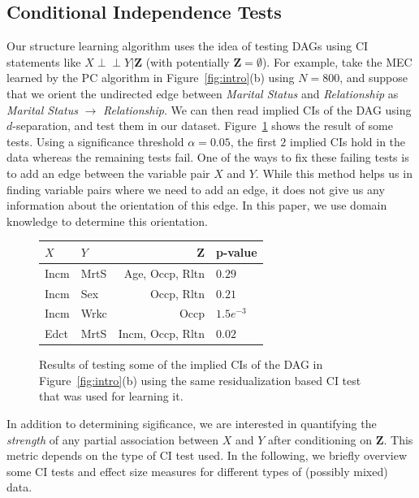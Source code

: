 \documentclass[accepted]{uai2025} %
\def\ci{\perp\!\!\!\!\perp}
\begin{document}
\subsection{Conditional Independence Tests}
\label{sec:ci_tests}
Our structure learning algorithm uses the idea of testing DAGs using CI statements
like $ X \ci Y \rvert \bm{Z} $ (with
potentially $ \bm{Z} = \emptyset $).
For example, take the MEC learned by the PC algorithm in
Figure~\ref{fig:intro}(b) using $ N=800 $, and suppose that we orient 
the undirected edge between \emph{Marital Status} and
\emph{Relationship}  as \emph{Marital Status} $ \rightarrow $
\emph{Relationship}. We can then read implied CIs of the DAG using $d$-separation,
and test them in our dataset. Figure~\ref{fig:ci_table} shows the result of some tests. 
Using a significance threshold  $\alpha=0.05 $, the first $ 2 $
implied CIs hold in the data whereas the remaining tests fail. One of the ways
to fix these failing tests is to add an edge between the variable pair $ X $
and $ Y $. While this method helps us in finding variable pairs where we need
to add an edge, it does not give us any information about the orientation of
this edge. In this paper, we use domain knowledge to determine this
orientation.

\begin{figure}
	\centering
	\begin{tabular}{llrl}
		$X$ & $Y$ & $ \bm{Z} $ & p-value \\
		\hline
		Incm & MrtS &  Age, Occp, Rltn & $ 0.29 $     \\
		Incm & Sex  &  Occp, Rltn      & $ 0.21 $     \\
		Incm & Wrkc &  Occp 	       & $ 1.5e^{-3} $ \\
		Edct & MrtS & Incm, Occp, Rltn & $ 0.02 $       \\
		\hline
	\end{tabular}
	\caption{Results of testing some of the implied CIs of the DAG in
		 Figure~\ref{fig:intro}(b) using the same residualization based
	 	 CI test that was used for learning it.}
	\label{fig:ci_table}
\end{figure}

In addition to determining sigificance, we are interested in quantifying the 
\emph{strength} of any partial association between $X$ and $Y$ after conditioning 
on $\mathbf{Z}$. This metric depends on the type of CI test used. In the following,
we briefly overview some CI tests and effect size measures
for different types of (possibly mixed) data.
\end{document}

